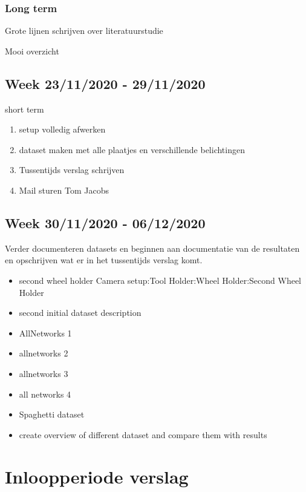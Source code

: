 \documentclass{article}
\begin{document}
\subsubsection{Long term}

Grote lijnen schrijven over literatuurstudie

Mooi overzicht



\subsection{Week 23/11/2020 - 29/11/2020}

short term

\begin{enumerate}[1]
\item setup volledig afwerken 
\item dataset maken met alle plaatjes en verschillende belichtingen
\item Tussentijds verslag schrijven
\item Mail sturen Tom Jacobs
\end{enumerate}


\subsection{Week 30/11/2020 - 06/12/2020}

Verder documenteren datasets en beginnen aan documentatie van de resultaten en opschrijven wat er in het tussentijds verslag komt.



\begin{itemize}
\item[\CheckedBox] second wheel holder Camera setup:Tool Holder:Wheel Holder:Second Wheel Holder
\item[\CheckedBox] second initial dataset description
\item[\CheckedBox] AllNetworks 1
\item[\CheckedBox] allnetworks 2
\item[\CheckedBox] allnetworks 3
\item[\CheckedBox] all networks 4
\item[\CheckedBox] Spaghetti dataset
\item[\Square] create overview of different dataset and compare them with results
\end{itemize}

		\section{Inloopperiode verslag}
\end{document}
